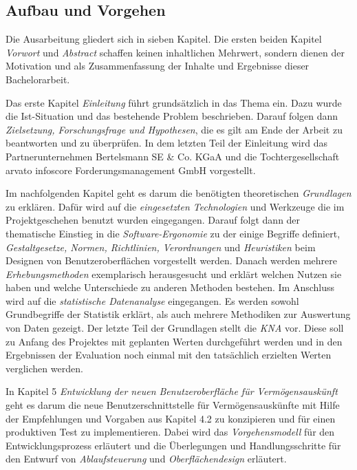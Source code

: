 \subsection{Aufbau und Vorgehen}
Die Ausarbeitung gliedert sich in sieben Kapitel. Die ersten beiden Kapitel \textit{Vorwort} und \textit{Abstract} schaffen keinen inhaltlichen Mehrwert, sondern dienen der Motivation und als Zusammenfassung der Inhalte und Ergebnisse dieser Bachelorarbeit.

Das erste Kapitel \textit{Einleitung} führt grundsätzlich in das Thema ein. Dazu wurde die Ist-Situation und das bestehende Problem beschrieben. Darauf folgen dann \textit{Zielsetzung, Forschungsfrage und Hypothesen}, die es gilt am Ende der Arbeit zu beantworten und zu überprüfen. In dem letzten Teil der Einleitung wird das Partnerunternehmen Bertelsmann SE \& Co. KGaA und die Tochtergesellschaft arvato infoscore Forderungsmanagement GmbH vorgestellt.

Im nachfolgenden Kapitel geht es darum die benötigten theoretischen \textit{Grundlagen} zu erklären. Dafür wird auf die \textit{eingesetzten Technologien} und Werkzeuge die im Projektgeschehen benutzt wurden eingegangen. Darauf folgt dann der thematische Einstieg in die \textit{Software-Ergonomie} zu der einige Begriffe definiert, \textit{Gestaltgesetze, Normen, Richtlinien, Verordnungen} und \textit{Heuristiken} beim Designen von Benutzeroberflächen vorgestellt werden. Danach werden mehrere \textit{Erhebungsmethoden} exemplarisch herausgesucht und erklärt welchen Nutzen sie haben und welche Unterschiede zu anderen Methoden bestehen. Im Anschluss wird auf die \textit{statistische Datenanalyse} eingegangen. Es werden sowohl Grundbegriffe der Statistik erklärt, als auch mehrere Methodiken zur Auswertung von Daten gezeigt. Der letzte Teil der Grundlagen stellt die \textit{\gls{KNA}} vor. Diese soll zu Anfang des Projektes mit geplanten Werten durchgeführt werden und in den Ergebnissen der Evaluation noch einmal mit den tatsächlich erzielten Werten verglichen werden.

In Kapitel 5 \textit{Entwicklung der neuen Benutzeroberfläche für Vermögensauskünft} geht es darum die neue Benutzerschnittstelle für Vermögensauskünfte mit Hilfe der Empfehlungen und Vorgaben aus Kapitel 4.2 zu konzipieren und für einen produktiven Test zu implementieren. Dabei wird das \textit{Vorgehensmodell} für den Entwicklungsprozess erläutert und die Überlegungen und Handlungsschritte für den Entwurf von \textit{Ablaufsteuerung} und \textit{Oberflächendesign} erläutert. 


